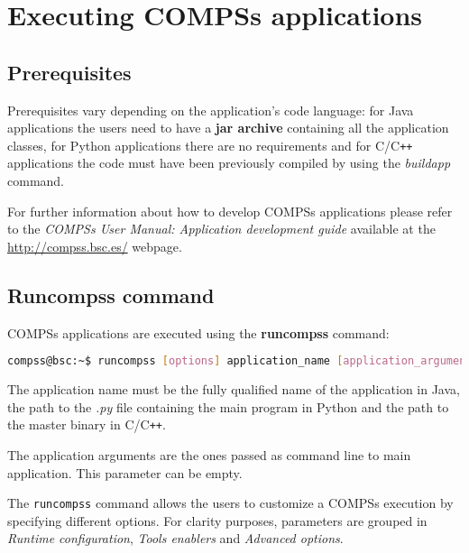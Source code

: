 \section{Executing COMPSs applications}
\label{sec:Executing}


\subsection{Prerequisites}
\label{subsec:prerequisites}
Prerequisites vary depending on the application's code language: for Java applications the users need to have
a \textbf{jar archive} containing all the application classes, for Python applications there are no requirements and for
C/C\texttt{++} applications the code must have been previously compiled by using the \textit{buildapp} command.

For further information about how to develop COMPSs applications please refer to the \textit{COMPSs User 
Manual: Application development guide} available at the \url{http://compss.bsc.es/} webpage.


\subsection{Runcompss command}
\label{subsec:runcompss}
COMPSs applications are executed using the \textbf{runcompss} command:
\begin{lstlisting}[language=bash]
compss@bsc:~$ runcompss [options] application_name [application_arguments]
\end{lstlisting}

The application name must be the fully qualified name of the application in Java, the path to the \textit{.py} file
containing the main program in Python and the path to the master binary in C/C\texttt{++}. 

The application arguments are the ones passed as command line to main application. This parameter can be empty. 

The \texttt{runcompss} command allows the users to customize a COMPSs execution by specifying different options.
For clarity purposes, parameters are grouped in \textit{Runtime configuration}, \textit{Tools enablers}
and \textit{Advanced options}.

